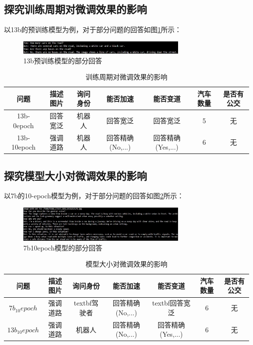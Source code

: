\documentclass[
    linespread = 1.25
]{ctexart}
\begin{document}
\subsection{探究训练周期对微调效果的影响}

以13b的预训练模型为例，对于部分问题的回答如图\ref{13b_0}所示：

\begin{figure}[ht] 
    \centering 
    \includegraphics[width=0.75\textwidth]{chat/13b_0-.jpg}
    \caption{13b预训练模型的部分回答} 
    \label{13b_0} %
\end{figure}

\begin{table}[ht]
\small
\centering
\caption{训练周期对微调效果的影响}%
\begin{tabular}{ccccccc}
\toprule
问题 & 描述图片 & 询问身份 & 能否加速 & 能否变道 & 汽车数量 & 是否有公交 \\
\midrule
13b-0epoch & 回答宽泛 & 机器人 & 回答宽泛 & 回答宽泛 & 5 & 无 \\
13b-10epoch & 强调道路 & 机器人 & 回答精确(No,...) & 回答精确(Yes,...) & 6 & 无 \\
\bottomrule
\end{tabular}
\label{effect_epoch}
\end{table}

\subsection{探究模型大小对微调效果的影响}

以7b的10-epoch模型为例，对于部分问题的回答如图\ref{7b_10}所示：

\begin{figure}[ht] 
    \centering 
    \includegraphics[width=0.75\textwidth]{chat/7b_10.jpg}
    \caption{7b10epoch模型的部分回答} 
    \label{7b_10} %
\end{figure}

\begin{table}[ht]
\centering
\caption{模型大小对微调效果的影响}%
\small
\begin{tabular}{ccccccc}
\toprule
问题 & 描述图片 & 询问身份 & 能否加速 & 能否变道 & 汽车数量 & 是否有公交 \\
\midrule
$7b_10epoch$ & 强调道路 & textbf{驾驶者} & 回答精确(No,...) & textbf{回答宽泛} & 6 & 无 \\
$13b_10epoch$ & 强调道路 & 机器人 & 回答精确(No,...) & 回答精确(Yes,...) & 6 & 无 \\
\bottomrule
\end{tabular}
\label{effect_size}
\end{table}
\end{document}
